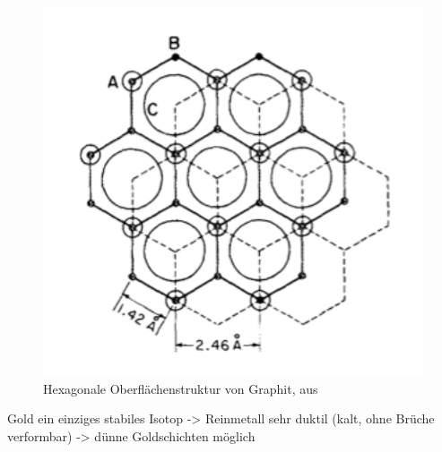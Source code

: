 \begin{figure}
    \includegraphics[width=1.0\textwidth]{pics/graphite}
    \caption{Hexagonale Oberflächenstruktur von Graphit, aus \cite{park1986tunneling}}
    \label{fig:graphite}
\end{figure} 

Gold
ein einziges stabiles Isotop -> Reinmetall
sehr duktil (kalt, ohne Brüche verformbar) -> dünne Goldschichten möglich

